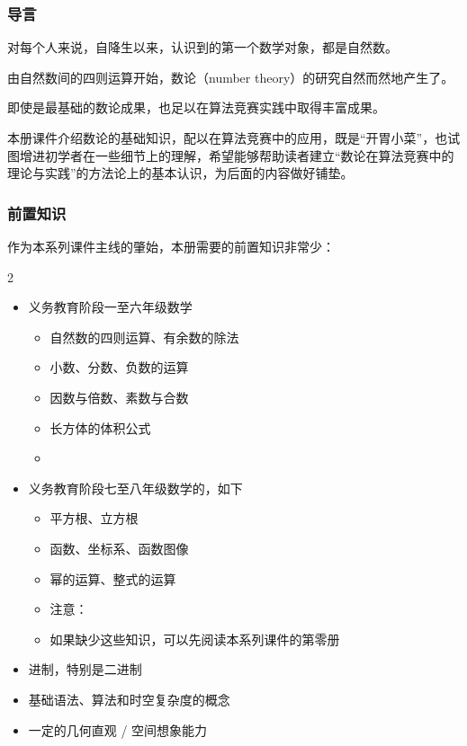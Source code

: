 
\begin{frame}
  \frametitle{导言}
  对每个人来说，自降生以来，认识到的第一个数学对象，都是自然数。
  \pause
  
  由自然数间的四则运算开始，数论（number theory）的研究自然而然地产生了。
  \pause
  
  \emptyline
  即使是最基础的数论成果，也足以在算法竞赛实践中取得丰富成果。
  \pause
  
  \emptyline
  本册课件介绍数论的基础知识，配以在算法竞赛中的应用，既是“开胃小菜”，也试图增进初学者在一些细节上的理解，希望能够帮助读者建立“数论在算法竞赛中的理论与实践”的方法论上的基本认识，为后面的内容做好铺垫。
\end{frame}
\begin{frame}
  \frametitle{前置知识}
  作为本系列课件主线的肇始，本册需要的前置知识非常少：
  \begin{mymulticols}[l][l]{2}
    \begin{itemize}
      \item 义务教育阶段一至六年级数学
      \begin{itemize}
        \item 自然数的四则运算、有余数的除法
        \item 小数、分数、负数的运算
        \item 因数与倍数、素数与合数
        \item 长方体的体积公式
        \item {}
      \end{itemize}
      \item 义务教育阶段七至八年级数学的，如下
      \begin{itemize}
        \item 平方根、立方根
        \item 函数、坐标系、函数图像
        \item 幂的运算、整式的运算
        \item 注意：
        \item \alert{如果缺少这些知识，可以先阅读本系列课件的第零册}
      \end{itemize}
    \end{itemize}
  \end{mymulticols}
  \begin{itemize}
    \item 进制，特别是二进制
    \item \Cpp{} 基础语法、算法和时空复杂度的概念
    \item 一定的几何直观 / 空间想象能力
  \end{itemize}
\end{frame}
